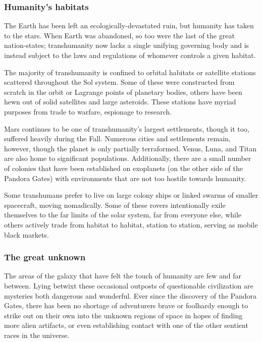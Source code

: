 \subsubsection{Humanity's habitats} \label{sec:humanitys-habitats} 

The Earth has been left an ecologically-devastated ruin, but humanity has taken to the stars. When Earth was abandoned, so too were the last of the great nation-states; transhumanity now lacks a single unifying governing body and is instead subject to the laws and regulations of whomever controls a given habitat. 

The majority of transhumanity is confined to orbital habitats or satellite stations scattered throughout the Sol system. Some of these were constructed from scratch in the orbit or Lagrange points of planetary bodies, others have been hewn out of solid satellites and large asteroids. These stations have myriad purposes from trade to warfare, espionage to research. 

Mars continues to be one of transhumanity's largest settlements, though it too, suffered heavily during the Fall. Numerous cities and settlements remain, however, though the planet is only partially terraformed. Venus, Luna, and Titan are also home to significant populations. Additionally, there are a small number of colonies that have been established on exoplanets (on the other side of the Pandora Gates) with environments that are not too hostile towards humanity. 

Some transhumans prefer to live on large colony ships or linked swarms of smaller spacecraft, moving nomadically. Some of these rovers intentionally exile themselves to the far limits of the solar system, far from everyone else, while others actively trade from habitat to habitat, station to station, serving as mobile black markets. 



\subsubsection{The great unknown} \label{sec:great-unknown} 

The areas of the galaxy that have felt the touch of humanity are few and far between. Lying betwixt these occasional outposts of questionable civilization are mysteries both dangerous and wonderful. Ever since the discovery of the Pandora Gates, there has been no shortage of adventurers brave or foolhardy enough to strike out on their own into the unknown regions of space in hopes of finding more alien artifacts, or even establishing contact with one of the other sentient races in the universe. 



